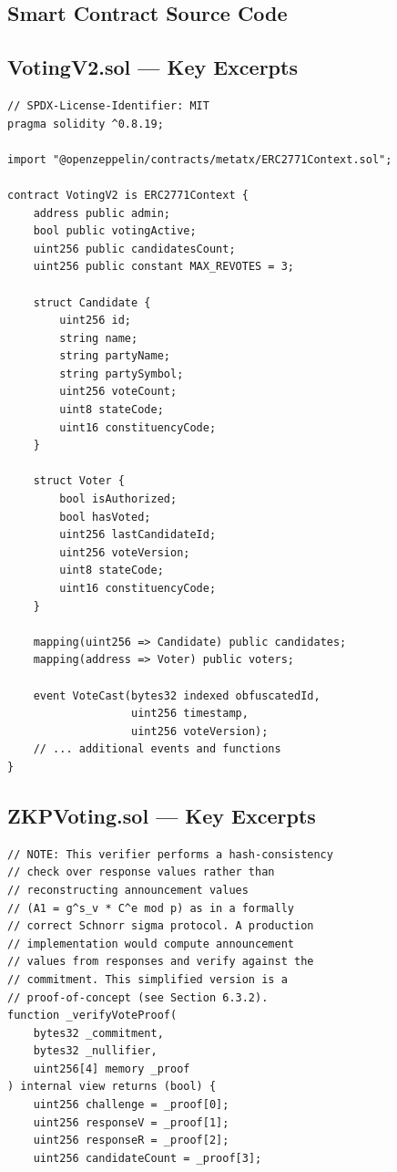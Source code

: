 \documentclass[oneside,a4paper,12pt]{book}
\begin{document}
\begin{appendices}

\chapter{Smart Contract Source Code}

\section{VotingV2.sol --- Key Excerpts}

\begin{lstlisting}[language=Solidity, caption={VotingV2.sol --- Contract Structure}]
// SPDX-License-Identifier: MIT
pragma solidity ^0.8.19;

import "@openzeppelin/contracts/metatx/ERC2771Context.sol";

contract VotingV2 is ERC2771Context {
    address public admin;
    bool public votingActive;
    uint256 public candidatesCount;
    uint256 public constant MAX_REVOTES = 3;

    struct Candidate {
        uint256 id;
        string name;
        string partyName;
        string partySymbol;
        uint256 voteCount;
        uint8 stateCode;
        uint16 constituencyCode;
    }

    struct Voter {
        bool isAuthorized;
        bool hasVoted;
        uint256 lastCandidateId;
        uint256 voteVersion;
        uint8 stateCode;
        uint16 constituencyCode;
    }

    mapping(uint256 => Candidate) public candidates;
    mapping(address => Voter) public voters;

    event VoteCast(bytes32 indexed obfuscatedId,
                   uint256 timestamp,
                   uint256 voteVersion);
    // ... additional events and functions
}
\end{lstlisting}

\section{ZKPVoting.sol --- Key Excerpts}

\begin{lstlisting}[language=Solidity, caption={ZKPVoting.sol --- ZKP Verification}]
// NOTE: This verifier performs a hash-consistency
// check over response values rather than
// reconstructing announcement values
// (A1 = g^s_v * C^e mod p) as in a formally
// correct Schnorr sigma protocol. A production
// implementation would compute announcement
// values from responses and verify against the
// commitment. This simplified version is a
// proof-of-concept (see Section 6.3.2).
function _verifyVoteProof(
    bytes32 _commitment,
    bytes32 _nullifier,
    uint256[4] memory _proof
) internal view returns (bool) {
    uint256 challenge = _proof[0];
    uint256 responseV = _proof[1];
    uint256 responseR = _proof[2];
    uint256 candidateCount = _proof[3];


\end{lstlisting}
\end{appendices}
\end{document}
